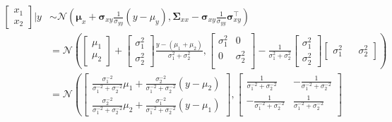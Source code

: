 \documentclass[12pt,a4paper]{article}
\begin{document}
\begin{itemize}
\begin{itemize}
\begin{align}
      \begin{bmatrix}
        x_{1}\\x_{2}
      \end{bmatrix}
      \bigg| y
      & \sim
        \mathcal{N}
        \left(
        \bm{\mu}_{x} + \bm{\sigma}_{xy}\frac{1}{\sigma_{yy}}(y-\mu_{y}),
        \bm{\Sigma}_{xx} - \bm{\sigma}_{xy}\frac{1}{\sigma_{yy}}\bm{\sigma}_{xy}^{\top}
        \right) \nonumber \\
      & =
        \mathcal{N}
        \left(
        \begin{bmatrix}
          \mu_{1} \\ \mu_{2}
        \end{bmatrix}
        +
        \begin{bmatrix}
          \sigma_{1}^{2} \\ \sigma_{2}^{2}
        \end{bmatrix}
        \frac{y-(\mu_{1}+\mu_{2})}{\sigma_{1}^{2}+\sigma_{2}^{2}},
        \begin{bmatrix}
          \sigma_{1}^{2} & 0 \\
          0 & \sigma_{2}^{2} \\
        \end{bmatrix}
        -
        \frac{1}{\sigma_{1}^{2}+\sigma_{2}^{2}}
        \begin{bmatrix}
          \sigma_{1}^{2} \\ \sigma_{2}^{2}
        \end{bmatrix}
        \begin{bmatrix}
          \sigma_{1}^{2} && \sigma_{2}^{2}
        \end{bmatrix}
        \right) \nonumber \\
      & =
        \mathcal{N}
      \left(
        \begin{bmatrix}
          \frac{\sigma_{1}^{-2}}{\sigma_{1}^{-2}+\sigma_{2}^{-2}}\mu_{1}
          +
          \frac{\sigma_{2}^{-2}}{\sigma_{1}^{-2}+\sigma_{2}^{-2}}(y-\mu_{2})
          \\
          \frac{\sigma_{2}^{-2}}{\sigma_{1}^{-2}+\sigma_{2}^{-2}}\mu_{2}
          +
          \frac{\sigma_{1}^{-2}}{\sigma_{1}^{-2}+\sigma_{2}^{-2}}(y-\mu_{1})
        \end{bmatrix},        
        \begin{bmatrix}
          \frac{1}{\sigma_{1}^{-2}+\sigma_{2}^{-2}} & -\frac{1}{\sigma_{1}^{-2}+\sigma_{2}^{-2}} \\
          -\frac{1}{\sigma_{1}^{-2}+\sigma_{2}^{-2}} & \frac{1}{\sigma_{1}^{-2}+\sigma_{2}^{-2}} \\

\end{bmatrix}
\end{align}
\end{itemize}
\end{itemize}
\end{document}
